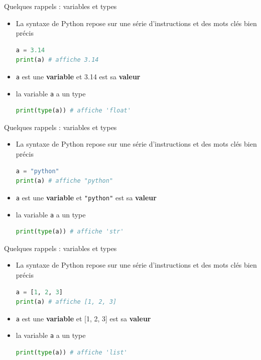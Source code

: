   \begin{frame}[fragile]{Quelques rappels : variables et types}
    \begin{itemize}
    \item<+->[\textcolor{white}{a}] La syntaxe de Python repose sur une série d'instructions et des mots clés bien précis
\begin{lstlisting}[language=Python, morekeywords={as, TypeError}, numbers=none]
a = 3.14
print(a) # affiche 3.14
\end{lstlisting}
    \item \texttt{a} est une \textbf{variable} et 3.14 est sa \textbf{valeur}
    \item la variable \texttt{a} a un type
\begin{lstlisting}[language=Python, morekeywords={as, TypeError}, numbers=none]
print(type(a)) # affiche 'float'
\end{lstlisting}
    \end{itemize}
\end{frame}



\begin{frame}[fragile]{Quelques rappels : variables et types}
    \begin{itemize}
    \item<+->[\textcolor{white}{a}] La syntaxe de Python repose sur une série d'instructions et des mots clés bien précis
\begin{lstlisting}[language=Python, morekeywords={as, TypeError}, numbers=none]
a = "python"
print(a) # affiche "python"
\end{lstlisting}
    \item \texttt{a} est une \textbf{variable} et \texttt{"python"} est sa \textbf{valeur}
    \item la variable \texttt{a} a un type
\begin{lstlisting}[language=Python, morekeywords={as, TypeError}, numbers=none]
print(type(a)) # affiche 'str'
\end{lstlisting}
    \end{itemize}
\end{frame}


\begin{frame}[fragile]{Quelques rappels : variables et types}
    \begin{itemize}
    \item<+->[\textcolor{white}{a}] La syntaxe de Python repose sur une série d'instructions et des mots clés bien précis
\begin{lstlisting}[language=Python, morekeywords={as, TypeError}, numbers=none]
a = [1, 2, 3]
print(a) # affiche [1, 2, 3]
\end{lstlisting}
    \item \texttt{a} est une \textbf{variable} et [1, 2, 3] est sa \textbf{valeur}
    \item la variable \texttt{a} a un type
\begin{lstlisting}[language=Python, morekeywords={as, TypeError}, numbers=none]
print(type(a)) # affiche 'list'
\end{lstlisting}
    \end{itemize}
\end{frame}


